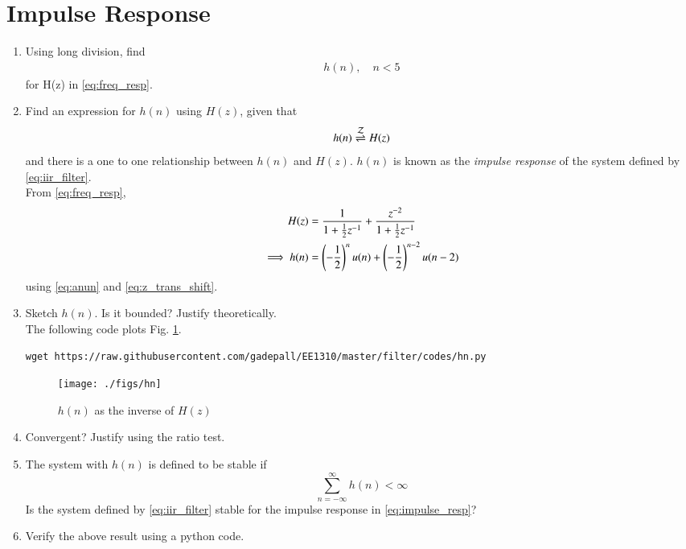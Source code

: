 \documentclass[journal,12pt,twocolumn]{IEEEtran}
\renewcommand\thesection{\arabic{section}}
\begin{document}
\section{Impulse Response}
\begin{enumerate}[label=\thesection.\arabic*]
	\item Using long division, 
find
		\begin{align}
			h(n), \quad n < 5
		\end{align}
		for H(z) in 
		\eqref{eq:freq_resp}.
\item \label{prob:impulse_resp}
Find an expression for $h(n)$ using $H(z)$, given that 
\begin{equation}
\label{eq:impulse_resp}
h(n) \overset{\mathcal{Z}}{ \rightleftharpoons} H(z)
\end{equation}
and there is a one to one relationship between $h(n)$ and $H(z)$. $h(n)$ is known as the {\em impulse response} of the
system defined by \eqref{eq:iir_filter}.
\\
\solution From \eqref{eq:freq_resp},
\begin{align}
H(z) &= \frac{1}{1 + \frac{1}{2}z^{-1}} + \frac{ z^{-2}}{1 + \frac{1}{2}z^{-1}}
\\
\implies h(n) &= \left(-\frac{1}{2}\right)^{n}u(n) + \left(-\frac{1}{2}\right)^{n-2}u(n-2)
\end{align}
using \eqref{eq:anun} and \eqref{eq:z_trans_shift}.
\item Sketch $h(n)$. Is it bounded? Justify theoretically.
\\
\solution The following code plots Fig. \ref{fig:hn}.
\begin{lstlisting}
wget https://raw.githubusercontent.com/gadepall/EE1310/master/filter/codes/hn.py
\end{lstlisting}
\begin{figure}[!ht]
\centering
\texttt{[image: ./figs/hn]}
\caption{$h(n)$ as the inverse of $H(z)$}
\label{fig:hn}
\end{figure}
%
\item Convergent? Justify using the ratio test.
\item The system with $h(n)$ is defined to be stable if
\begin{equation}
\sum_{n=-\infty}^{\infty}h(n) < \infty
\end{equation}
Is the system defined by \eqref{eq:iir_filter} stable for the impulse response in \eqref{eq:impulse_resp}?
%
\item Verify the above result using a python code.

\end{enumerate}
\end{document}
